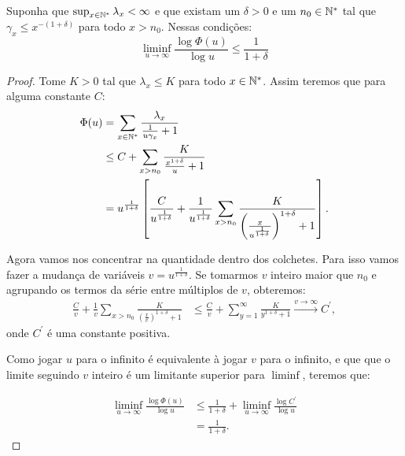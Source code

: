 \begin{proposicao}
  \label{prop:dominar-dim-haus-sup}
  Suponha que $\sup_{x\in{\mathbb{N^*}}}\lambda_x < \infty$ e que existam um
  $\delta>0$ e um $n_0 \in {\mathbb{N^*}}$ tal que $\gamma_x \leq x^{-(1+\delta)}$
  para todo $x > n_0$. Nessas condições:
  \begin{equation}
    \liminf_{u \to \infty} \frac{\log \Phi(u)}{\log u}  \leq \frac{1}{1+\delta}
  \end{equation}
\end{proposicao}

\begin{proof}
  Tome $K > 0$ tal que $\lambda_x \leq K$ para todo $x \in {\mathbb{N^*}}$. Assim
  teremos que para alguma constante $C$:
  \begin{align*}
    \Phi(u) &= \sum_{x \in {\mathbb{N^*}}} \frac{\lambda_x}{\frac{1}{u\gamma_x} +
      1}\\
    &\leq C + \sum_{x > n_0} \frac{K}{\frac{x^{1+\delta}}{u} + 1}\\
    &=u^{\frac{1}{1+\delta}} \left[
      \frac{C}{u^{\frac{1}{1+\delta}}} +
      \frac{1}{u^{\frac{1}{1+\delta}}} \sum_{x > n_0} \frac{K}{
        \left( \frac{x}{u^{\frac{1}{1+\delta}}}  \right)^{1+\delta}
        + 1
      }
    \right].
  \end{align*}

  Agora vamos nos concentrar na quantidade dentro dos colchetes. Para
  isso vamos fazer a mudança de variáveis $v =
  u^{\frac{1}{1+\delta}}$. Se tomarmos $v$ inteiro maior que $n_0$ e
  agrupando os termos da série entre múltiplos de $v$, obteremos:
  \begin{align*}
    \frac{C}{v} + \frac{1}{v} \sum_{x > n_0} \frac{K}{ \left(
        \frac{x}{v} \right)^{1+\delta} + 1 }
    &\leq
    \frac{C}{v} + \sum_{y=1}^{\infty} \frac{K}{y^{1+\delta} + 1}
    \xrightarrow{v \to \infty} C^\prime,
  \end{align*}
  onde $C^\prime$ é uma constante positiva.

  Como jogar $u$ para o infinito é equivalente à jogar $v$ para o
  infinito, e que que o limite seguindo $v$ inteiro é um limitante
  superior para $\liminf$, teremos que:

  \begin{align*}
    \liminf_{u \to \infty} \frac{\log \Phi(u)}{\log u} &\leq
    \frac{1}{1+\delta} + \liminf_{u \to \infty} 
    \frac{\log{C^\prime}}{\log u}\\
    &= \frac{1}{1+\delta}.
  \end{align*}
\end{proof}

